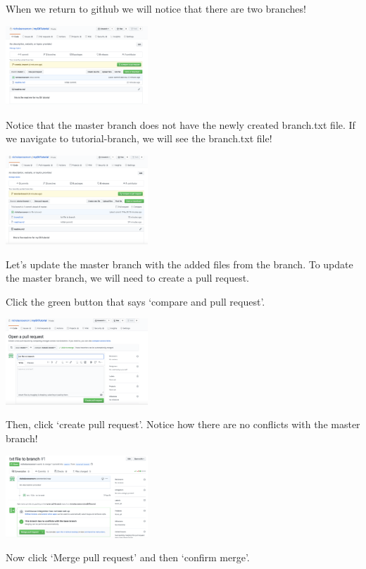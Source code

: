 \documentclass[]{book}
\begin{document}
When we return to github we will notice that there are two branches!

\includegraphics[width=0.40000\textwidth]{images/branch.png}

Notice that the master branch does not have the newly created branch.txt
file. If we navigate to tutorial-branch, we will see the branch.txt
file!

\includegraphics[width=0.40000\textwidth]{images/commit.png}

Let's update the master branch with the added files from the branch. To
update the master branch, we will need to create a pull request.

Click the green button that says `compare and pull request'.

\includegraphics[width=0.40000\textwidth]{images/pull.png}

Then, click `create pull request'. Notice how there are no conflicts
with the master branch!

\includegraphics[width=0.40000\textwidth]{images/merge.png}

Now click `Merge pull request' and then `confirm merge'.
\end{document}
